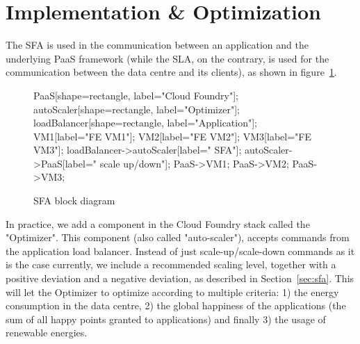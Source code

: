 \section{Implementation \& Optimization}
\label{sec:implem}

The SFA is used in the communication between an application and the underlying PaaS framework (while the SLA, on the contrary, is used for the communication between the data centre and its clients), as shown in figure~\ref{fig:SFABlock}.

\begin{figure}[h]
\label{fig:SFABlock}
\centering
{}
{
   PaaS[shape=rectangle, label="Cloud Foundry"];
   autoScaler[shape=rectangle, label="Optimizer"];
   loadBalancer[shape=rectangle, label="Application"];
   VM1[label="FE VM1"];
   VM2[label="FE VM2"];
   VM3[label="FE VM3"];
   loadBalancer->autoScaler[label=" SFA"];
   autoScaler->PaaS[label=" scale up/down"];
   PaaS->VM1;
   PaaS->VM2;
   PaaS->VM3;
}
\caption{SFA block diagram}
\end{figure}

In practice, we add a component in the Cloud Foundry stack called the "Optimizer".
This component (also called "auto-scaler"), accepts commands from the application load balancer.
Instead of just scale-up/scale-down commands as it is the case currently, we include a recommended scaling level, together with a positive deviation and a negative deviation, as described in Section~\ref{sec:sfa}.
This will let the Optimizer to optimize according to multiple criteria: 1) the energy consumption in the data centre, 2) the global happiness of the applications (the sum of all happy points granted to applications) and finally 3) the usage of renewable energies.